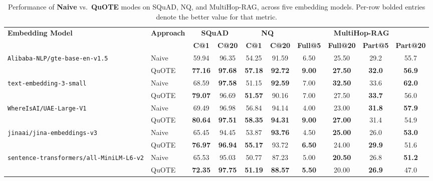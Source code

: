 \begin{table*}[t]
\centering
\small
\caption{Performance of \textbf{Naive} vs.\ \textbf{QuOTE} modes on SQuAD, NQ, and MultiHop-RAG, 
across five embedding models. Per-row bolded entries denote the better value for that metric. %
}
\label{tab:embeddings-comparison}
\renewcommand{\arraystretch}{1.05}
\begin{tabular}{ll|cc|cc|cccc}
\toprule
\multirow{2}{*}{\textbf{Embedding Model}} 
& \multirow{2}{*}{\textbf{Approach}} 
& \multicolumn{2}{c|}{\textbf{SQuAD}} 
& \multicolumn{2}{c|}{\textbf{NQ}} 
& \multicolumn{4}{c}{\textbf{MultiHop-RAG}} \\
\cmidrule(lr){3-4}\cmidrule(lr){5-6}\cmidrule(lr){7-10}
& 
& \textbf{C@1} & \textbf{C@20}
& \textbf{C@1} & \textbf{C@20}
& \textbf{Full@5} & \textbf{Full@20} & \textbf{Part@5} & \textbf{Part@20} \\
\midrule
\multirow{2}{*}{\texttt{Alibaba-NLP/gte-base-en-v1.5}} 
& Naive 
  & 59.94 & 96.35
  & 54.25 & 91.59
  & 6.50 & 25.50 & 29.2 & 55.7 \\
& QuOTE 
  & \textbf{77.16} & \textbf{97.68}
  & \textbf{57.18} & \textbf{92.72}
  & \textbf{9.00} & \textbf{27.50} & \textbf{32.0} & \textbf{56.9} \\
\midrule
\multirow{2}{*}{\texttt{text-embedding-3-small}} 
& Naive 
  & 68.59 & \textbf{97.58}
  & 51.15 & \textbf{92.59}
  & 7.00 & \textbf{32.50} & 33.6 & \textbf{62.0} \\
& QuOTE   
  & \textbf{79.07} & 96.69
  & \textbf{51.57} & 90.16
  & 7.00 & 27.50 & \textbf{33.7} & 56.0 \\
\midrule
\multirow{2}{*}{\texttt{WhereIsAI/UAE-Large-V1}}
& Naive
  & 69.49 & 96.98
  & 56.84 & 94.14
  & 4.00 & 23.00 & \textbf{31.8} & \textbf{57.9} \\
& QuOTE
  & \textbf{80.64} & \textbf{97.51}
  & \textbf{58.35} & \textbf{94.31}
  & \textbf{9.00} & \textbf{27.00} & 31.4 & 54.9 \\
\midrule
\multirow{2}{*}{\texttt{jinaai/jina-embeddings-v3}}
& Naive
  & 65.45 & 94.45
  & 53.87 & \textbf{93.76}
  & 4.50 & \textbf{25.00} & 26.0 & \textbf{53.0} \\
& QuOTE
  & \textbf{76.97} & \textbf{96.94}
  & \textbf{55.17} & 93.72
  & \textbf{6.50} & 24.00 & \textbf{29.9} & 51.6 \\
\midrule
\multirow{2}{*}{\texttt{sentence-transformers/all-MiniLM-L6-v2}}
& Naive
  & 65.53 & 95.03
  & 50.77 & 87.23
  & 5.00 & \textbf{20.50} & 26.8 & \textbf{51.2} \\
& QuOTE
  & \textbf{72.35} & \textbf{97.75}
  & \textbf{51.19} & \textbf{88.57}
  & \textbf{5.50} & 20.00 & \textbf{26.9} & 47.0 \\
\bottomrule
\end{tabular}
\end{table*}



